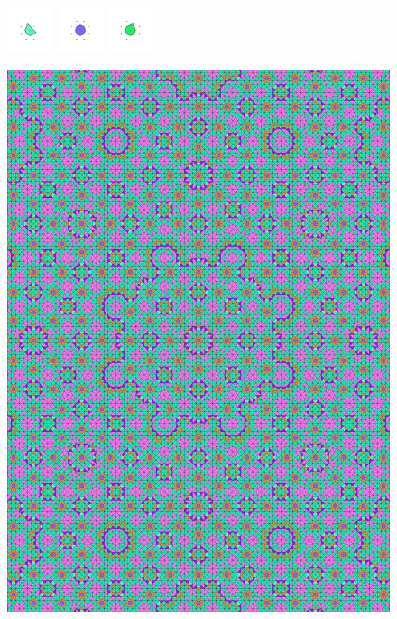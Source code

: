 \documentclass[text.tex]{subfiles}
\begin{document}
\begin{figure}[h!]
\includegraphics[width=0.12\textwidth]{img/results/octagon/octagon_220710_(2_1alpha_2)_014.pdf}
\includegraphics[width=0.12\textwidth]{img/results/octagon/octagon_220710_(2_1alpha_2)_015.pdf}
\includegraphics[width=0.12\textwidth]{img/results/octagon/octagon_220710_(2_1alpha_2)_016.pdf}
\end{figure}

\begin{figure}[h!]
\centering
\includegraphics[width=1\textwidth]{img/results/octagon/quasi_polygon-octagon_220710_(2_1alpha_2).pdf}
\end{figure}
\end{document}
